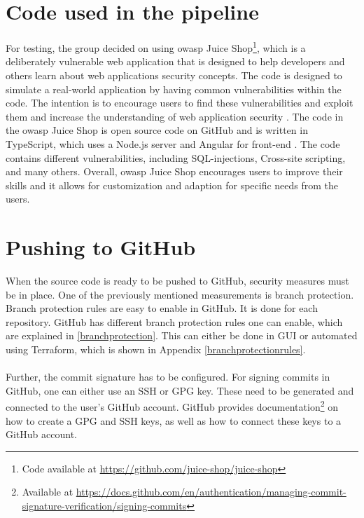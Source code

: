 \section{Code used in the pipeline}
For testing, the group decided on using \acrshort{owasp} Juice Shop\footnote{Code available at \url{https://github.com/juice-shop/juice-shop}}, which is a deliberately vulnerable web application that is designed to help developers and others learn about web applications security concepts. The code is designed to simulate a real-world application by having common vulnerabilities within the code. The intention is to encourage users to find these vulnerabilities and exploit them and increase the understanding of web application security \cite{owaspJuiceShop}.
The code in the \acrshort{owasp} Juice Shop is open source code on GitHub and is written in TypeScript, which uses a Node.js server and Angular for \gls{front-end} \cite{owaspJuiceShopCode}.
The code contains different vulnerabilities, including \gls{SQL-injection}s, \gls{Cross-site scripting}, and many others. 
Overall, \acrshort{owasp} Juice Shop encourages users to improve their skills and it allows for customization and adaption for specific needs from the users. 

 
\section{Pushing to GitHub}
When the source code is ready to be pushed to GitHub, security measures must be in place. One of the previously mentioned measurements is branch protection. Branch protection rules are easy to enable in GitHub. It is done for each repository. GitHub has different branch protection rules one can enable, which are explained in \ref{branchprotection}. This can either be done in \gls{GUI} or automated using Terraform, which is shown in Appendix \ref{branchprotectionrules}. 
\\~\\
Further, the commit signature has to be configured. For signing commits in GitHub, one can either use an SSH or GPG key. These need to be generated and connected to the user's GitHub account.
GitHub provides documentation\footnote{Available at \url{https://docs.github.com/en/authentication/managing-commit-signature-verification/signing-commits}} on how to create a GPG and SSH keys, as well as how to connect these keys to a GitHub account.

